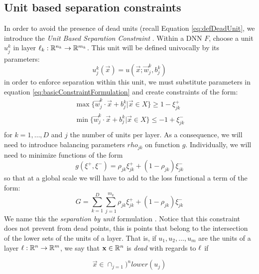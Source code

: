 \subsection{Unit based separation constraints \SepUnit}\label{subsec:sepUnit}
In order to avoid the presence of dead units (recall Equation \ref{eq:defDeadUnit}, we introduce the \emph{Unit Based Separation Constraint} \SepUnit. Within a \ReLU DNN $F$, choose a unit $u_j^k$ in layer $\ell_k:\mathbb{R}^{n_k}\rightarrow\mathbb{R}^{m_k}$. This unit will be defined univocally by its parameters:
\begin{equation}\label{eq:unitSepParameterWriting}
    u^k_j(\vec{x}) = u(\vec{x};\vec{w}^k_j,b^k_j)
\end{equation}
in order to enforce separation within this unit, we must substitute parameters in equation \ref{eq:basicConstraintFormulation} and create constraints of the form:
\begin{equation}
    \begin{array}{lcl}
    \max\{\vec{w}^k_j\cdot\vec{x}+b^k_j|\vec{x}\in X\}\geq 1-\xi^{+}_{jk}\\
    \min\{\vec{w}^k_j\cdot\vec{x}+b^k_j|\vec{x}\in X\}\leq -1+\xi^{-}_{jk}\\
\end{array}
\end{equation}
for $k=1,\ldots,D$ and $j$ the number of units per layer. As a consequence, we will need to introduce balancing parameters $rho_{jk}$ on function $g$. Individually, we will need to minimize functions of the form
\begin{equation}
    g(\xi^{+},\xi^{-}) = \rho_{jk}\xi^{+}_{jk}+(1-\rho_{jk})\xi^{-}_{jk}
\end{equation}
so that at a global scale we will have to add to the loss functional a term of the form:
\begin{equation}\label{eq:constraintLossForUnitSeparation}
    G = \sum_{k=1}^{D}\sum_{j=1}^{m_k}\rho_{jk}\xi^{+}_{jk}+(1-\rho_{jk})\xi^{-}_{jk}
\end{equation}
We name this the \emph{separation by unit} formulation \SepUnit. Notice that this constraint does not prevent from dead points, this is points that belong to the intersection of the lower sets of the units of a layer. That is, if $u_1,u_2,\ldots,u_m$ are the units of a layer $\ell:\mathbb{R}^{n}\rightarrow\mathbb{R}^{m}$, we say that $\mathbf{x}\in\mathbb{R}^{n}$ is \emph{dead} with regards to $\ell$  if

\begin{equation}\label{eq:deadPoint}
 \vec{x}\in \displaystyle\cap_{j=1})^n lower(u_j)
\end{equation}


